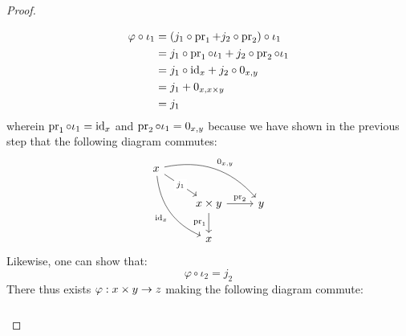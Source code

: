 \begin{proof}
\begin{enumerate}
                                        $$
                                            \begin{aligned}
                                                \varphi \circ \iota_1 & = (j_1 \circ \pr_1 + j_2 \circ \pr_2) \circ \iota_1
                                                \\
                                                & = j_1 \circ \pr_1 \circ \iota_1 + j_2 \circ \pr_2 \circ \iota_1
                                                \\
                                                & = j_1 \circ \id_x + j_2 \circ 0_{x, y}
                                                \\
                                                & = j_1 + 0_{x, x \x y}
                                                \\
                                                & = j_1
                                            \end{aligned}
                                        $$
                                    wherein $\pr_1 \circ \iota_1 = \id_x$ and $\pr_2 \circ \iota_1 = 0_{x, y}$ because we have shown in the previous step that the following diagram commutes:
                                        $$
                                            \begin{tikzcd}
                                                x \arrow[rd, "j_1" description] \arrow[rrd, "{0_{x, y}}", bend left] \arrow[rdd, "\id_x"', bend right] &                                               &   \\
                                                                                                                                                       & x \x y \arrow[r, "\pr_2"] \arrow[d, "\pr_1"'] & y \\
                                                                                                                                                       & x                                             &  
                                            \end{tikzcd}
                                        $$
                                    Likewise, one can show that:
                                        $$\varphi \circ \iota_2 = j_2$$
                                    There thus exists $\varphi: x \x y \to z$ making the following diagram commute:
                                        $$
                                            \begin{tikzcd}

\end{tikzcd}$$
\end{enumerate}
\end{proof}
